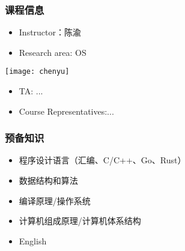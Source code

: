 %
%
\begin{frame}[plain,t]
	\frametitle{课程信息}
	\begin{itemize}
		\item Instructor：陈渝	 
		\item Research area: OS
	\end{itemize}	
	\texttt{[image: chenyu]}

 	\begin{itemize}
 		\item TA: ...
		\item Course Representatives:...
	\end{itemize}


\end{frame}
\begin{frame}[plain]

\frametitle{预备知识}

\begin{itemize}

\item 程序设计语言（汇编、C/C++、Go、Rust）
\item 数据结构和算法 \pause
\item 编译原理/操作系统 
\item 计算机组成原理/计算机体系结构 \pause

\item English
\end{itemize}

\end{frame}
